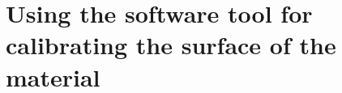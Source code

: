 \documentclass[10pt,a4paper]{report}
\begin{document}
%
%
%
%
%
%
%
%
%
%
%
%
%
%
%
%
%
%
\newpage

\newpage

\chapter{ Using the software tool for calibrating the surface of the material}
\end{document}

